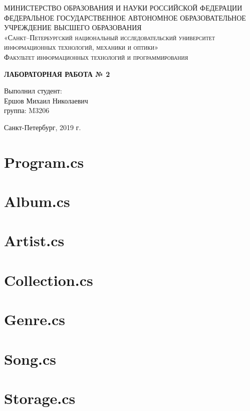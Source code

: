\documentclass{article}
\begin{document}
        \begin{titlepage}
        \begin{center}
        \textsc{МИНИСТЕРСТВО ОБРАЗОВАНИЯ И НАУКИ РОССИЙСКОЙ ФЕДЕРАЦИИ ФЕДЕРАЛЬНОЕ ГОСУДАРСТВЕННОЕ АВТОНОМНОЕ ОБРАЗОВАТЕЛЬНОЕ УЧРЕЖДЕНИЕ ВЫСШЕГО ОБРАЗОВАНИЯ\\[5mm]
        «Санкт–Петербургский национальный исследовательский университет информационных технологий, механики и оптики»\\[20mm]
        Факультет информационных технологий и программирования\\[5mm]
        }
        \vfill
        
        \textbf{ЛАБОРАТОРНАЯ РАБОТА № 2 \\[20mm]}
        \end{center}
        
        \hfill
        \begin{minipage}{.3\textwidth}
        Выполнил студент:\\[2mm] 
        Ершов Михаил Николаевич \\
        группа: M3206\\[5mm]
        \end{minipage}%
        \vfill
        \begin{center}
        Санкт-Петербург, 2019 г.
        \end{center}
        \end{titlepage}
 
\section{Program.cs}
 
\newpage
\section{Album.cs}
 
\newpage
\section{Artist.cs}
 
\newpage
\section{Collection.cs}
 
\newpage
\section{Genre.cs}
 
\newpage
\section{Song.cs}
 
\newpage
\section{Storage.cs}
 

\newpage
\end{document}
